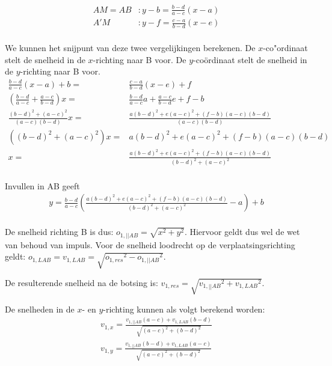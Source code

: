 \documentclass[12pt,a4paper]{article}
\begin{document}
	\begin{equation}
		\begin{aligned}
			AM=AB&: y-b=\frac{b-d}{a-c}\left(x-a\right)\\
			A'M&: y-f=\frac{c-a}{b-d}\left(x-e\right)\\
		\end{aligned}
	\end{equation}

	We kunnen het snijpunt van deze twee vergelijkingen berekenen. De $x$-co"{o}rdinaat stelt de snelheid in de $x$-richting naar B voor. De $y$-co\"{o}rdinaat stelt de snelheid in de $y$-richting naar B voor.
	\begin{equation}
		\begin{aligned}
			\frac{b-d}{a-c}\left(x-a\right)+b=&\frac{c-a}{b-d}\left(x-e\right)+f\\
			\left(\frac{b-d}{a-c}+\frac{a-c}{b-d}\right)x=&\frac{b-d}{a-c}a+\frac{a-c}{b-d}e+f-b\\
			\frac{(b-d)^2+(a-c)^2}{(a-c)(b-d)}x=&\frac{a(b-d)^2+e(a-c)^2+(f-b)(a-c)(b-d)}{(a-c)(b-d)}\\
			\left((b-d)^2+(a-c)^2\right)x=&a(b-d)^2+e(a-c)^2+(f-b)(a-c)(b-d)\\
			x=&\frac{a(b-d)^2+e(a-c)^2+(f-b)(a-c)(b-d)}{(b-d)^2+(a-c)^2}\\
		\end{aligned}
	\end{equation}

	Invullen in AB geeft 
	\begin{equation}
		\begin{aligned}
			y=\frac{b-d}{a-c}\left(\frac{a(b-d)^2+e(a-c)^2+(f-b)(a-c)(b-d)}{(b-d)^2+(a-c)^2}-a\right)+b\\
		\end{aligned}
	\end{equation}

	De snelheid richting B is dus: $o_{1, ||AB}=\sqrt{x^2+y^2}$. Hiervoor geldt dus wel de wet van behoud van impuls. Voor de snelheid loodrecht op de verplaatsingsrichting geldt: $o_{1, LAB}=v_{1, LAB}=\sqrt{{o_{1, res}}^2-{o_{1, ||AB}}^2}$.

	De resulterende snelheid na de botsing is: $v_{1, res}=\sqrt{{v_{1, ||AB}}^2+{v_{1, LAB}}^2}$.

	De snelheden in de $x$- en $y$-richting kunnen als volgt berekend worden:
	\begin{equation}
		\begin{aligned}
			v_{1, x}=\frac{v_{1, ||AB}\left(a-c\right)+v_{1, LAB}\left(b-d\right)}{\sqrt{\left(a-c\right)^2+\left(b-d\right)^2}}\\
			v_{1, y}=\frac{v_{1, ||AB}\left(b-d\right)+v_{1, LAB}\left(a-c\right)}{\sqrt{\left(a-c\right)^2+\left(b-d\right)^2}}\\
		\end{aligned}
	\end{equation}
\end{document}
